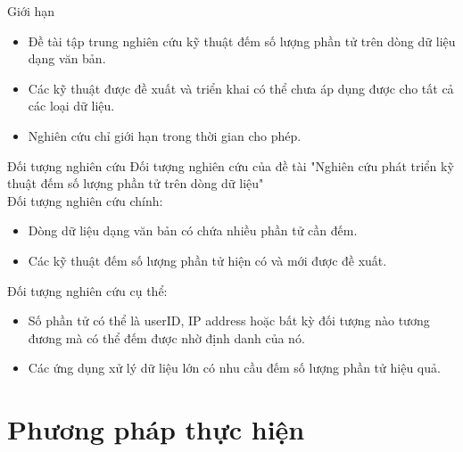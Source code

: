 \documentclass[10pt]{beamer}
\begin{document}
{
  \begin{frame}{Giới hạn}
    \begin{itemize}
        \item Đề tài tập trung nghiên cứu kỹ thuật đếm số lượng phần tử trên dòng dữ liệu dạng văn bản.
        \item Các kỹ thuật được đề xuất và triển khai có thể chưa áp dụng được cho tất cả các loại dữ liệu.
        \item Nghiên cứu chỉ giới hạn trong thời gian cho phép.
    \end{itemize}
  \end{frame}
}

{
    \begin{frame}{Đối tượng nghiên cứu}
    Đối tượng nghiên cứu của đề tài "Nghiên cứu phát triển kỹ thuật đếm số lượng phần tử trên dòng dữ liệu"\\
    Đối tượng nghiên cứu chính:
    \begin{itemize}
        \item Dòng dữ liệu dạng văn bản có chứa nhiều phần tử cần đếm.
        \item Các kỹ thuật đếm số lượng phần tử hiện có và mới được đề xuất.
    \end{itemize}
    Đối tượng nghiên cứu cụ thể:
    \begin{itemize}
        \item Số phần tử có thể là userID, IP address hoặc bất kỳ đối tượng nào tương đương mà có thể đếm được nhờ định danh của nó.
        \item Các ứng dụng xử lý dữ liệu lớn có nhu cầu đếm số lượng phần tử hiệu quả.
    \end{itemize}
  \end{frame}
}

\section{Phương pháp thực hiện}
\end{document}
